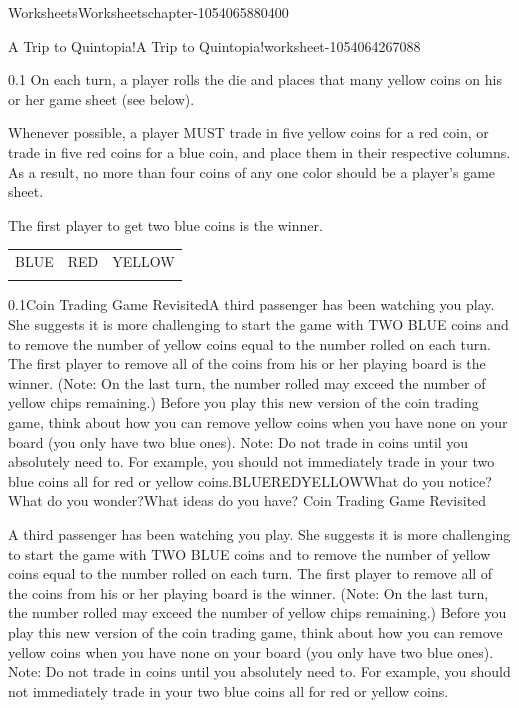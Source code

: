\documentclass[twoside,11pt,]{book}
\begin{document}
\begin{chapterptx}{Worksheets}{}{Worksheets}{}{}{chapter-1054065880400}
\begin{worksheet-section-numberless}{A Trip to Quintopia!}{}{A Trip to Quintopia!}{}{}{worksheet-1054064267088}
\begin{divisionexercise}{1}{}{0.1}
On each turn, a player rolls the die and places that many yellow coins on his or her game sheet (see below).%
\par
\hypertarget{p-1054064326048}{}%
Whenever possible, a player MUST trade in five yellow coins for a red coin, or trade in five red coins for a blue coin, and place them in their respective columns.  As a result, no more than four coins of any one color should be a player’s game sheet.%
\par
\hypertarget{p-1054064329632}{}%
The first player to get two blue coins is the winner.%
\begin{table}
\centering
\begin{tabular}{lll}
BLUE&RED&YELLOW\tabularnewline[0pt]
&&
\end{tabular}
\end{table}
\end{divisionexercise}%
\clearpage
\begin{divisionexercise}{2}{}{0.1}{Coin Trading Game RevisitedA third passenger has been watching you play.  She suggests it is more challenging to start the game with TWO BLUE coins and to remove the number of yellow coins equal to the number rolled on each turn.  The first player to remove all of the coins from his or her playing board is the winner.  (Note: On the last turn, the number rolled may exceed the number of yellow chips remaining.)  Before you play this new version of the coin trading game, think about how you can remove yellow coins when you have none on your board (you only have two blue ones).  Note: Do not trade in coins until you absolutely need to.  For example, you should not immediately trade in your two blue coins all for red or yellow coins.BLUEREDYELLOWWhat do you notice?What do you wonder?What ideas do you have?}%
\hypertarget{p-1054064686160}{}%
Coin Trading Game Revisited%
\par
\hypertarget{p-1054064642736}{}%
A third passenger has been watching you play.  She suggests it is more challenging to start the game with TWO BLUE coins and to remove the number of yellow coins equal to the number rolled on each turn.  The first player to remove all of the coins from his or her playing board is the winner.  (Note: On the last turn, the number rolled may exceed the number of yellow chips remaining.)  Before you play this new version of the coin trading game, think about how you can remove yellow coins when you have none on your board (you only have two blue ones).  Note: Do not trade in coins until you absolutely need to.  For example, you should not immediately trade in your two blue coins all for red or yellow coins.%

\end{divisionexercise}
\end{worksheet-section-numberless}
\end{chapterptx}
\end{document}
